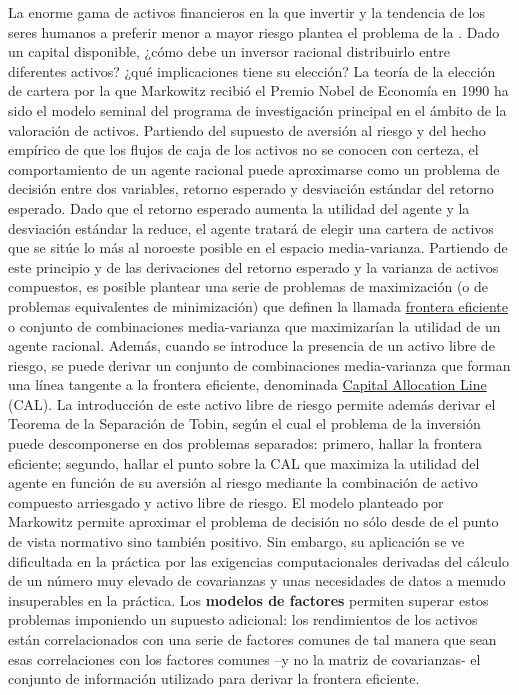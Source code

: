\documentclass{nuevotema}
\begin{document}
La enorme gama de activos financieros en la que invertir y la tendencia de los seres humanos a preferir menor a mayor riesgo plantea el problema de la . Dado un capital disponible, ¿cómo debe un inversor racional distribuirlo entre diferentes activos? ¿qué implicaciones tiene su elección? La teoría de la elección de cartera por la que Markowitz recibió el Premio Nobel de Economía en 1990 ha sido el modelo seminal del programa de investigación principal en el ámbito de la valoración de activos. Partiendo del supuesto de aversión al riesgo y del hecho empírico de que los flujos de caja de los activos no se conocen con certeza, el comportamiento de un agente racional puede aproximarse como un problema de decisión entre dos variables, retorno esperado y desviación estándar del retorno esperado. Dado que el retorno esperado aumenta la utilidad del agente y la desviación estándar la reduce, el agente tratará de elegir una cartera de activos que se sitúe lo más al noroeste posible en el espacio media-varianza. Partiendo de este principio y de las derivaciones del retorno esperado y la varianza de activos compuestos, es posible plantear una serie de problemas de maximización (o de problemas equivalentes de minimización) que definen la llamada \underline{frontera eficiente} o conjunto de combinaciones media-varianza que maximizarían la utilidad de un agente racional. Además, cuando se introduce la presencia de un activo libre de riesgo, se puede derivar un conjunto de combinaciones media-varianza que forman una línea tangente a la frontera eficiente, denominada  \underline{Capital Allocation Line} (CAL). La introducción de este activo libre de riesgo permite además derivar el Teorema de la Separación de Tobin, según el cual el problema de la inversión puede descomponerse en dos problemas separados: primero, hallar la frontera eficiente; segundo, hallar el punto sobre la CAL que maximiza la utilidad del agente en función de su aversión al riesgo mediante la combinación de activo compuesto arriesgado y activo libre de riesgo. El modelo planteado por Markowitz permite aproximar el problema de decisión no sólo desde de el punto de vista normativo sino también positivo. Sin embargo, su aplicación se ve dificultada en la práctica por las exigencias computacionales derivadas del cálculo de un número muy elevado de covarianzas y unas necesidades de datos a menudo insuperables en la práctica. Los \textbf{modelos de factores} permiten superar estos problemas imponiendo un supuesto adicional: los rendimientos de los activos están correlacionados con una serie de factores comunes de tal manera que sean esas correlaciones con los factores comunes --y no la matriz de covarianzas- el conjunto de información utilizado para derivar la frontera eficiente.
\end{document}
